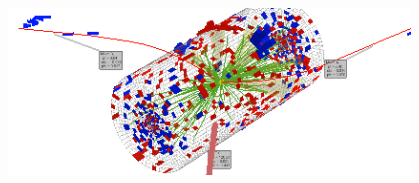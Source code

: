 \begin{minipage}{0.90\linewidth} 
\begin{center}
\includegraphics[height=7cm, width=0.8\textwidth]{THESISPLOTS/Observed_Event_CMS_Run206484-Lumi620-EventNumber871295869-206484_871295869_620_3DTower.png} 
\label{fig:3-D}
\end{center}
\end{minipage}

